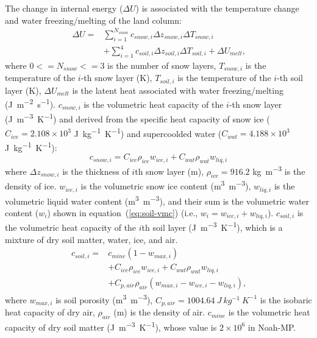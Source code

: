 \documentclass[essd]{copernicus}
\begin{document}
The change in internal energy ($\Delta U$) is associated with the temperature
change and water freezing/melting of the land column:
\begin{equation}
    \begin{split}
        \Delta U = & \sum_{i=1}^{N_{snow}} c_{snow,i} \Delta z_{snow,i} \Delta T_{snow,i} \\
        & + \sum_{i=1}^{4} c_{soil,i} \Delta z_{soil,i} \Delta T_{soil,i}
        + \Delta U_{melt} \text{,}
    \end{split}
\end{equation}
where $0<=N_{snow}<=3$ is the number of snow layers, $T_{snow,i}$ is the
temperature of the $i$-th snow layer (\unit{K}), $T_{soil,i}$ is the temperature
of the $i$-th soil layer (\unit{K}), $\Delta U_{melt}$ is the latent heat
associated with water freezing/melting (\unit{J~m^{-2}~s^{-1}}). $c_{snow,i}$ is
the volumetric heat capacity of the $i$-th snow layer (\unit{J~m^{-3}~K^{-1}})
and derived from the specific heat capacity of snow ice ($C_{ice} = 2.108 \times
10^3$ \unit{J~kg^{-1}~K^{-1}}) and supercoolded water ($C_{wat} = 4.188 \times
10^3$ \unit{J~kg^{-1}~K^{-1}}):
\begin{equation}
    c_{snow,i} = C_{ice} \rho_{ice} w_{ice,i} + C_{wat} \rho_{wat} w_{liq,i}
\end{equation}
where $\Delta z_{snow,i}$ is the thickness of $i$th snow layer (\unit{m}),
$\rho_{ice} = 916.2$ \unit{kg~m^{-3}} is the density of ice. $w_{ice,i}$ is the
volumetric snow ice content (\unit{m^3~m^{-3}}), $w_{liq,i}$ is the volumetric
liquid water content (\unit{m^3~m^{-3}}), and their sum is the volumetric water
content ($w_{i}$) shown in equation~(\ref{eq:soil-vmc}) (i.e., $w_{i} =
w_{ice,i} + w_{liq,i}$). $c_{soil,i}$ is the volumetric heat capacity of the
$i$th soil layer (\unit{J~m^{-3}~K^{-1}}), which is a mixture of dry soil
matter, water, ice, and air.
\begin{equation}
    \begin{split}
        c_{soil,i} = & c_{mine} (1 - w_{max,i}) \\
        & + C_{ice} \rho_{ice} w_{ice,i} + C_{wat} \rho_{wat} w_{liq,i} \\
        & + C_{p,air} \rho_{air} (w_{max,i} - w_{ice,i} - w_{liq,i}) \text{,}
    \end{split}
\end{equation}
where $w_{max,i}$ is soil porosity (\unit{m^3~m^{-3}}), $C_{p,air} =
1004.64~\unit{J~kg^{-1}~K^{-1}}$ is the isobaric heat capacity of dry air,
$\rho_{air}$ (\unit{m}) is the density of air. $c_{mine}$ is the volumetric heat
capacity of dry soil matter (\unit{J~m^{-3}~K^{-1}}), whose value is
$2\times10^6$ in Noah-MP.
\end{document}
